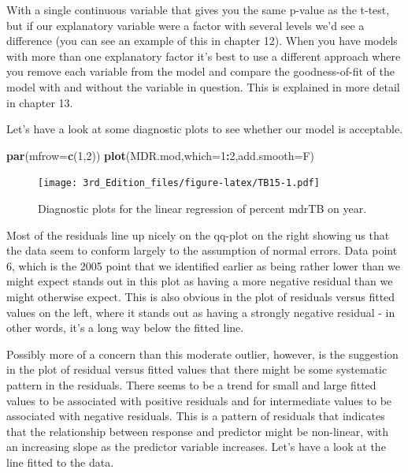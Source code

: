 \documentclass[
]{book}
\newenvironment{Shaded}{\begin{snugshade}}{\end{snugshade}}
\newcommand{\DataTypeTok}[1]{\textcolor[rgb]{0.13,0.29,0.53}{#1}}
\newcommand{\DecValTok}[1]{\textcolor[rgb]{0.00,0.00,0.81}{#1}}
\newcommand{\KeywordTok}[1]{\textcolor[rgb]{0.13,0.29,0.53}{\textbf{#1}}}
\newcommand{\NormalTok}[1]{#1}
\newcommand{\OperatorTok}[1]{\textcolor[rgb]{0.81,0.36,0.00}{\textbf{#1}}}
\begin{document}
With a single continuous variable that gives you the same p-value as the t-test, but if our explanatory variable were a factor with several levels we'd see a difference (you can see an example of this in chapter 12). When you have models with more than one explanatory factor it's best to use a different approach where you remove each variable from the model and compare the goodness-of-fit of the model with and without the variable in question. This is explained in more detail in chapter 13.

Let's have a look at some diagnostic plots to see whether our model is acceptable.

\begin{Shaded}
\begin{Highlighting}[]
\KeywordTok{par}\NormalTok{(}\DataTypeTok{mfrow=}\KeywordTok{c}\NormalTok{(}\DecValTok{1}\NormalTok{,}\DecValTok{2}\NormalTok{))}
\KeywordTok{plot}\NormalTok{(MDR.mod,}\DataTypeTok{which=}\DecValTok{1}\OperatorTok{:}\DecValTok{2}\NormalTok{,}\DataTypeTok{add.smooth=}\NormalTok{F)}
\end{Highlighting}
\end{Shaded}

\begin{figure}
\centering
\texttt{[image: 3rd\_Edition\_files/figure-latex/TB15-1.pdf]}
\caption{\label{fig:TB15}Diagnostic plots for the linear regression of percent mdrTB on year.}
\end{figure}

Most of the residuals line up nicely on the qq-plot on the right showing us that the data seem to conform largely to the assumption of normal errors. Data point 6, which is the 2005 point that we identified earlier as being rather lower than we might expect stands out in this plot as having a more negative residual than we might otherwise expect. This is also obvious in the plot of residuals versus fitted values on the left, where it stands out as having a strongly negative residual - in other words, it's a long way below the fitted line.

Possibly more of a concern than this moderate outlier, however, is the suggestion in the plot of residual versus fitted values that there might be some systematic pattern in the residuals. There seems to be a trend for small and large fitted values to be associated with positive residuals and for intermediate values to be associated with negative residuals. This is a pattern of residuals that indicates that the relationship between response and predictor might be non-linear, with an increasing slope as the predictor variable increases. Let's have a look at the line fitted to the data.
\end{document}

